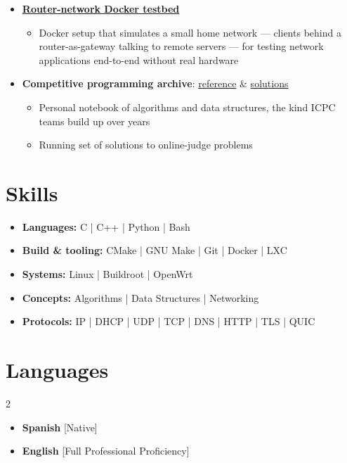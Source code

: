 \documentclass[11pt,a4paper,sans]{moderncv}
\begin{document}
\begin{itemize}[label=\textbullet]
\begin{itemize}
        \end{itemize}
    \item \href{https://github.com/eliogovea/router-network-docker}{\textbf{Router-network Docker testbed}}
        \begin{itemize}
            \item Docker setup that simulates a small home network --- clients behind a router-as-gateway talking to remote servers --- for testing network applications end-to-end without real hardware
        \end{itemize}
    \item \textbf{Competitive programming archive}: \href{https://github.com/eliogovea/icpc-reference}{\color{blue}reference} \& \href{https://github.com/eliogovea/solutions_cp}{\color{blue}solutions}
        \begin{itemize}
            \item Personal notebook of algorithms and data structures, the kind ICPC teams build up over years
            \item Running set of solutions to online-judge problems
        \end{itemize}
\end{itemize}

\section{Skills}

{\begin{itemize}[label=\textbullet]
\item \textbf{Languages:} C | C++ | Python | Bash
\item \textbf{Build \& tooling:} CMake | GNU Make | Git | Docker | LXC
\item \textbf{Systems:} Linux | Buildroot | OpenWrt
\item \textbf{Concepts:} Algorithms | Data Structures | Networking
\item \textbf{Protocols:} IP | DHCP | UDP | TCP | DNS | HTTP | TLS | QUIC
\end{itemize}}

\section{Languages}

\begin{multicols}{2}
    \begin{itemize}[label=\textbullet]
    \item \textbf{Spanish} [Native]
    \item {\textbf{English} [Full Professional Proficiency]}
    \end{itemize}
\end{multicols}
\end{document}
